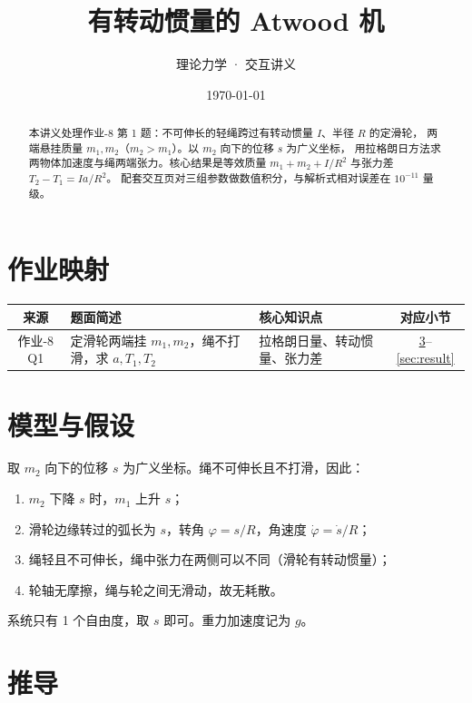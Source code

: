 \documentclass[UTF8,a4paper,11pt]{ctexart}
\title{\textbf{有转动惯量的 Atwood 机}}
\author{理论力学 · 交互讲义}
\date{\today}
\begin{document}
\maketitle

\begin{abstract}
本讲义处理作业-8 第 1 题：不可伸长的轻绳跨过有转动惯量 $I$、半径 $R$ 的定滑轮，
两端悬挂质量 $m_1,m_2$（$m_2>m_1$）。以 $m_2$ 向下的位移 $s$ 为广义坐标，
用拉格朗日方法求两物体加速度与绳两端张力。核心结果是等效质量
$m_1+m_2+I/R^2$ 与张力差 $T_2-T_1=Ia/R^2$。
配套交互页对三组参数做数值积分，与解析式相对误差在 $10^{-11}$ 量级。
\end{abstract}

\tableofcontents
\newpage

\section{作业映射}

\begin{center}
\small
\begin{tabular}{cp{6.2cm}p{3.4cm}c}
\toprule
来源 & 题面简述 & 核心知识点 & 对应小节 \\
\midrule
作业-8 Q1 & 定滑轮两端挂 $m_1,m_2$，绳不打滑，求 $a,T_1,T_2$ &
  拉格朗日量、转动惯量、张力差 & \ref{sec:derive}--\ref{sec:result} \\
\bottomrule
\end{tabular}
\end{center}

\section{模型与假设}\label{sec:model}

取 $m_2$ 向下的位移 $s$ 为广义坐标。绳不可伸长且不打滑，因此：
\begin{enumerate}
  \item $m_2$ 下降 $s$ 时，$m_1$ 上升 $s$；
  \item 滑轮边缘转过的弧长为 $s$，转角 $\varphi=s/R$，角速度 $\dot\varphi=\dot s/R$；
  \item 绳轻且不可伸长，绳中张力在两侧可以不同（滑轮有转动惯量）；
  \item 轮轴无摩擦，绳与轮之间无滑动，故无耗散。
\end{enumerate}
系统只有 1 个自由度，取 $s$ 即可。重力加速度记为 $g$。

\section{推导}\label{sec:derive}
\end{document}
